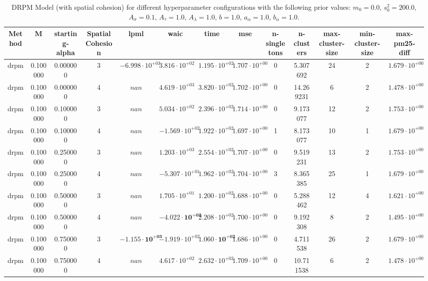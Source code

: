 \begin{table}
\caption{DRPM Model (with spatial cohesion) for different hyperparameter configurations with the following prior values: $m_0 = 0.0$, $s_0^2 = 200.0$, $A_\sigma = 0.1$, $A_\tau = 1.0$, $A_\lambda = 1.0$, $b = 1.0$, $a_\alpha = 1.0$, $b_\alpha = 1.0$.}
\centering
\begin{tabular}{ccccccccccccc}
\toprule
Method & M & starting-alpha & SpatialCohesion & lpml & waic & time & mse & n-singletons & n-clusters & max-cluster-size & min-cluster-size & max-pm25-diff \\
\midrule
drpm & 0.100000 & 0.000000 & 3 & $-6.998 \cdot 10^{+03}$ & $3.816 \cdot 10^{+02}$ & $1.195 \cdot 10^{+02}$ & $1.707 \cdot 10^{+00}$ & 0 & 5.307692 & 24 & 2 & $1.679 \cdot 10^{+00}$ \\
drpm & 0.100000 & 0.000000 & 4 & $nan$ & $4.619 \cdot 10^{+03}$ & $3.820 \cdot 10^{+02}$ & $1.702 \cdot 10^{+00}$ & 0 & 14.269231 & 6 & 2 & $1.478 \cdot 10^{+00}$ \\
drpm & 0.100000 & 0.100000 & 3 & $nan$ & $5.034 \cdot 10^{+02}$ & $2.396 \cdot 10^{+02}$ & $1.714 \cdot 10^{+00}$ & 0 & 9.173077 & 12 & 2 & $1.753 \cdot 10^{+00}$ \\
drpm & 0.100000 & 0.100000 & 4 & $nan$ & $-1.569 \cdot 10^{+02}$ & $1.922 \cdot 10^{+02}$ & $1.697 \cdot 10^{+00}$ & 1 & 8.173077 & 10 & 1 & $1.679 \cdot 10^{+00}$ \\
drpm & 0.100000 & 0.250000 & 3 & $nan$ & $1.203 \cdot 10^{+03}$ & $2.554 \cdot 10^{+02}$ & $1.707 \cdot 10^{+00}$ & 0 & 9.519231 & 13 & 2 & $1.753 \cdot 10^{+00}$ \\
drpm & 0.100000 & 0.250000 & 4 & $nan$ & $-5.307 \cdot 10^{+01}$ & $1.962 \cdot 10^{+02}$ & $1.704 \cdot 10^{+00}$ & 3 & 8.365385 & 25 & 1 & $1.679 \cdot 10^{+00}$ \\
drpm & 0.100000 & 0.500000 & 3 & $nan$ & $1.705 \cdot 10^{+01}$ & $1.200 \cdot 10^{+02}$ & $1.688 \cdot 10^{+00}$ & 0 & 5.288462 & 12 & 4 & $1.621 \cdot 10^{+00}$ \\
drpm & 0.100000 & 0.500000 & 4 & $nan$ & $\mathbf{-4.022 \cdot 10^{+02}}$ & $2.208 \cdot 10^{+02}$ & $1.700 \cdot 10^{+00}$ & 0 & 9.192308 & 8 & 2 & $1.495 \cdot 10^{+00}$ \\
drpm & 0.100000 & 0.750000 & 3 & $\mathbf{-1.155 \cdot 10^{+03}}$ & $-1.919 \cdot 10^{+02}$ & $\mathbf{1.060 \cdot 10^{+02}}$ & $1.686 \cdot 10^{+00}$ & 0 & 4.711538 & 26 & 2 & $1.679 \cdot 10^{+00}$ \\
drpm & 0.100000 & 0.750000 & 4 & $nan$ & $4.617 \cdot 10^{+02}$ & $2.632 \cdot 10^{+02}$ & $1.709 \cdot 10^{+00}$ & 0 & 10.711538 & 6 & 2 & $1.478 \cdot 10^{+00}$ \\

\end{tabular}
\end{table}
